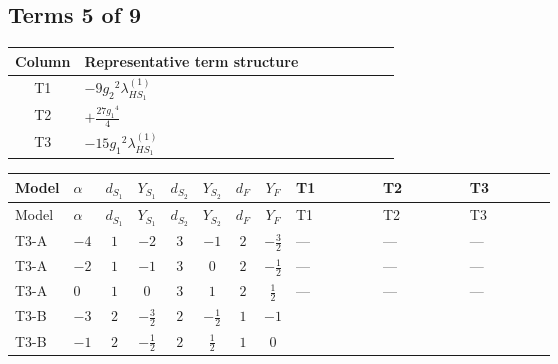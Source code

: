 \documentclass[8pt]{article}
\begin{document}
\begin{landscape}
\subsection*{Terms 5 of 9}
\begin{center}
\begin{tabular}{@{}c >{\raggedright\arraybackslash}p{0.82\linewidth}@{}}
\toprule
Column & Representative term structure \\
\midrule
T1 & \(\displaystyle -9 {g_2}^2 {\lambda_{HS_1}^{(1)}}\) \\
\midrule
T2 & \(\displaystyle +\frac{27 {g_1}^4}{4}\) \\
\midrule
T3 & \(\displaystyle -15 {g_1}^2 {\lambda_{HS_1}^{(1)}}\) \\
\midrule
\bottomrule
\end{tabular}
\end{center}
\smallskip
\tiny
\begin{longtable}{@{}llcccccc >{\raggedright\arraybackslash}p{0.21\linewidth} >{\raggedright\arraybackslash}p{0.21\linewidth} >{\raggedright\arraybackslash}p{0.21\linewidth}@{}}
\toprule
Model & $\alpha$ & $d_{S_1}$ & $Y_{S_1}$ & $d_{S_2}$ & $Y_{S_2}$ & $d_F$ & $Y_F$ & T1 & T2 & T3 \\
\midrule
\endfirsthead
\toprule
Model & $\alpha$ & $d_{S_1}$ & $Y_{S_1}$ & $d_{S_2}$ & $Y_{S_2}$ & $d_F$ & $Y_F$ & T1 & T2 & T3 \\
\midrule
\endhead
T3-A & $-4$ & $1$ & $-2$ & $3$ & $-1$ & $2$ & $-\frac{3}{2}$ & --- & --- & --- \\
\midrule
T3-A & $-2$ & $1$ & $-1$ & $3$ & $0$ & $2$ & $-\frac{1}{2}$ & --- & --- & --- \\
\midrule
T3-A & $0$ & $1$ & $0$ & $3$ & $1$ & $2$ & $\frac{1}{2}$ & --- & --- & --- \\
\midrule
T3-B & $-3$ & $2$ & $-\frac{3}{2}$ & $2$ & $-\frac{1}{2}$ & $1$ & $-1$ & \scriptsize\adjustbox{max width=\linewidth}{$\begin{gathered} -9 {g_2}^2 {\lambda_{HS_1}^{(1)}}\end{gathered}$} & \scriptsize\adjustbox{max width=\linewidth}{$\begin{gathered} +\frac{27 {g_1}^4}{4}\end{gathered}$} & \scriptsize\adjustbox{max width=\linewidth}{$\begin{gathered} -15 {g_1}^2 {\lambda_{HS_1}^{(1)}}\end{gathered}$} \\
\midrule
T3-B & $-1$ & $2$ & $-\frac{1}{2}$ & $2$ & $\frac{1}{2}$ & $1$ & $0$ & \scriptsize\adjustbox{max width=\linewidth}{$\begin{gathered} -9 {g_2}^2 {\lambda_{HS_1}^{(1)}}\end{gathered}$} & \scriptsize\adjustbox{max width=\linewidth}{$\begin{gathered} +\frac{3 {g_1}^4}{4}\end{gathered}$} & \scriptsize\adjustbox{max width=\linewidth}{$\begin{gathered} -3 {g_1}^2 {\lambda_{HS_1}^{(1)}}\end{gathered}$} \\

\end{longtable}
\end{landscape}
\end{document}
